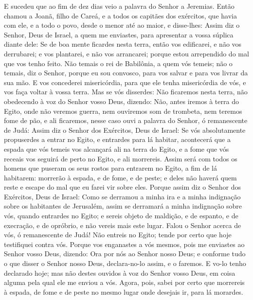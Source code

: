 E sucedeu que ao fim de dez dias veio a palavra do Senhor a
Jeremias. Então chamou a Joanã, filho de Careá, e a todos os
capitães dos exércitos, que havia com ele, e a todo o povo, desde o
menor até ao maior, e disse-lhes: Assim diz o Senhor, Deus de
Israel, a quem me enviastes, para apresentar a vossa súplica diante
dele: Se de boa mente ficardes nesta terra, então vos
edificarei, e não vos derrubarei; e vos plantarei, e não vos
arrancarei; porque estou arrependido do mal que vos tenho feito.
Não temais o rei de Babilônia, a quem vós temeis; não o
temais, diz o Senhor, porque eu sou convosco, para vos salvar e para
vos livrar da sua mão. E vos concederei misericórdia, para
que ele tenha misericórdia de vós, e vos faça voltar à vossa terra.
Mas se vós disserdes: Não ficaremos nesta terra, não
obedecendo à voz do Senhor vosso Deus, dizendo: Não, antes
iremos à terra do Egito, onde não veremos guerra, nem ouviremos som
de trombeta, nem teremos fome de pão, e ali ficaremos, nesse
caso ouvi a palavra do Senhor, ó remanescente de Judá: Assim diz o
Senhor dos Exércitos, Deus de Israel: Se vós absolutamente
propuserdes a entrar no Egito, e entrardes para lá habitar,
acontecerá que a espada que vós temeis vos alcançará ali na
terra do Egito, e a fome que vós receais vos seguirá de perto no
Egito, e ali morrereis. Assim será com todos os homens que
puseram os seus rostos para entrarem no Egito, a fim de lá
habitarem: morrerão à espada, e de fome, e de peste; e deles não
haverá quem reste e escape do mal que eu farei vir sobre eles.
Porque assim diz o Senhor dos Exércitos, Deus de Israel: Como
se derramou a minha ira e a minha indignação sobre os habitantes de
Jerusalém, assim se derramará a minha indignação sobre vós, quando
entrardes no Egito; e sereis objeto de maldição, e de espanto, e de
execração, e de opróbrio, e não vereis mais este lugar. Falou
o Senhor acerca de vós, ó remanescente de Judá! Não entreis no
Egito; tende por certo que hoje testifiquei contra vós.
Porque vos enganastes a vós mesmos, pois me enviastes ao
Senhor vosso Deus, dizendo: Ora por nós ao Senhor nosso Deus; e
conforme tudo o que disser o Senhor nosso Deus, declara-no-lo assim,
e o faremos. E vo-lo tenho declarado hoje; mas não destes
ouvidos à voz do Senhor vosso Deus, em coisa alguma pela qual ele me
enviou a vós. Agora, pois, sabei por certo que morrereis à
espada, de fome e de peste no mesmo lugar onde desejais ir, para lá
morardes.

\medskip

